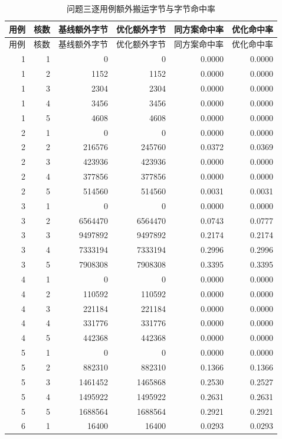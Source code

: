 \begin{longtable}{rrrrrr}
\caption{问题三逐用例额外搬运字节与字节命中率}\label{tab:q3-traffic}\\
\toprule 用例 & 核数 & 基线额外字节 & 优化额外字节 & 同方案命中率 & 优化命中率\\\midrule
\endfirsthead
\toprule 用例 & 核数 & 基线额外字节 & 优化额外字节 & 同方案命中率 & 优化命中率\\\midrule
\endhead
1 & 1 & 0 & 0 & 0.0000 & 0.0000 \\
1 & 2 & 1152 & 1152 & 0.0000 & 0.0000 \\
1 & 3 & 2304 & 2304 & 0.0000 & 0.0000 \\
1 & 4 & 3456 & 3456 & 0.0000 & 0.0000 \\
1 & 5 & 4608 & 4608 & 0.0000 & 0.0000 \\
2 & 1 & 0 & 0 & 0.0000 & 0.0000 \\
2 & 2 & 216576 & 245760 & 0.0372 & 0.0369 \\
2 & 3 & 423936 & 423936 & 0.0000 & 0.0000 \\
2 & 4 & 377856 & 377856 & 0.0000 & 0.0000 \\
2 & 5 & 514560 & 514560 & 0.0031 & 0.0031 \\
3 & 1 & 0 & 0 & 0.0000 & 0.0000 \\
3 & 2 & 6564470 & 6564470 & 0.0743 & 0.0777 \\
3 & 3 & 9497892 & 9497892 & 0.2174 & 0.2174 \\
3 & 4 & 7333194 & 7333194 & 0.2996 & 0.2996 \\
3 & 5 & 7908308 & 7908308 & 0.3395 & 0.3395 \\
4 & 1 & 0 & 0 & 0.0000 & 0.0000 \\
4 & 2 & 110592 & 110592 & 0.0000 & 0.0000 \\
4 & 3 & 221184 & 221184 & 0.0000 & 0.0000 \\
4 & 4 & 331776 & 331776 & 0.0000 & 0.0000 \\
4 & 5 & 442368 & 442368 & 0.0000 & 0.0000 \\
5 & 1 & 0 & 0 & 0.0000 & 0.0000 \\
5 & 2 & 882310 & 882310 & 0.1366 & 0.1366 \\
5 & 3 & 1461452 & 1465868 & 0.2530 & 0.2527 \\
5 & 4 & 1495922 & 1495922 & 0.2631 & 0.2631 \\
5 & 5 & 1688564 & 1688564 & 0.2921 & 0.2921 \\
6 & 1 & 16400 & 16400 & 0.0293 & 0.0293 \\

\end{longtable}
